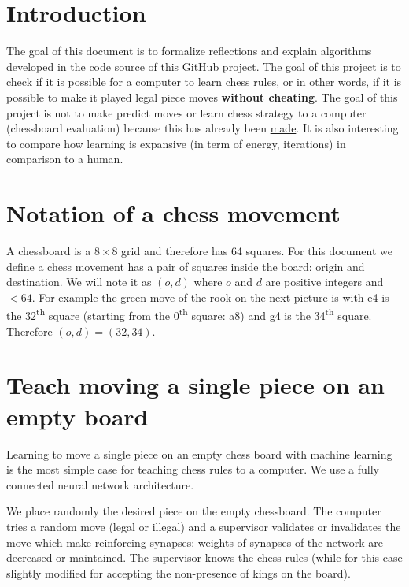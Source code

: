 \documentclass[a4paper,10pt]{article}
\begin{document}
%
\newcommand{\norm}[1]{\left\lVert#1\right\rVert}

\section*{Introduction}

The goal of this document is to formalize reflections and explain algorithms
developed in the code source of this
\href{https://github.com/Lecrapouille/ChessNeuNeu}{GitHub project}. The goal of
this project is to check if it is possible for a computer to learn chess rules,
or in other words, if it is possible to make it played legal piece moves
\textbf{without cheating}. The goal of this project is not to make predict moves
or learn chess strategy to a computer (chessboard evaluation) because this has
already been \href{https://github.com/ashudeep/ConvChess}{made}. It is also
interesting to compare how learning is expansive (in term of energy, iterations)
in comparison to a human.

\section{Notation of a chess movement}
A chessboard is a $8 \times 8$ grid and therefore has 64 squares. For this
document we define a chess movement has a pair of squares inside the board:
origin and destination. We will note it as $(o, d)$ where $o$ and $d$ are
positive integers and $< 64$. For example the green move of the rook on the
next picture is  with e4 is the 32\textsuperscript{th} square
(starting from the 0\textsuperscript{th} square: a8) and g4 is the
34\textsuperscript{th} square. Therefore $(o, d) = (32, 34)$.

\section{Teach moving a single piece on an empty board}

Learning to move a single piece on an empty chess board with machine learning is
the most simple case for teaching chess rules to a computer. We use a fully
connected neural network architecture.

We place randomly the desired piece on the empty chessboard. The computer tries
a random move (legal or illegal) and a supervisor validates or invalidates the
move which make reinforcing synapses: weights of synapses of the network are
decreased or maintained. The supervisor knows the chess rules (while for this
case slightly modified for accepting the non-presence of kings on the board).
\end{document}
